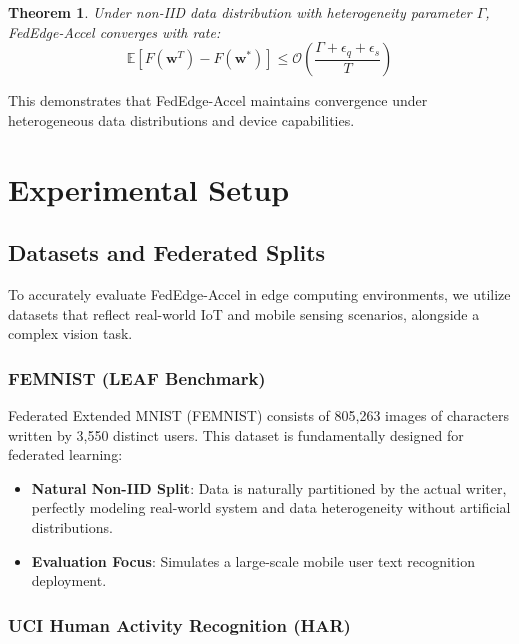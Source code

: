 \documentclass[journal]{IEEEtran}
\newtheorem{theorem}{Theorem}
\begin{document}
\begin{theorem}
Under non-IID data distribution with heterogeneity parameter $\Gamma$, FedEdge-Accel converges with rate:
\begin{equation}
\mathbb{E}[F(\mathbf{w}^T) - F(\mathbf{w}^*)] \leq \mathcal{O}\left(\frac{\Gamma + \epsilon_q + \epsilon_s}{T}\right)
\label{eq:heterogeneity_convergence}
\end{equation}
\end{theorem}

This demonstrates that FedEdge-Accel maintains convergence under heterogeneous data distributions and device capabilities.

\section{Experimental Setup}
\label{sec:experimental_setup}

\subsection{Datasets and Federated Splits}

To accurately evaluate FedEdge-Accel in edge computing environments, we utilize datasets that reflect real-world IoT and mobile sensing scenarios, alongside a complex vision task.

\subsubsection{FEMNIST (LEAF Benchmark)}

Federated Extended MNIST (FEMNIST) consists of 805,263 images of characters written by 3,550 distinct users. This dataset is fundamentally designed for federated learning:
\begin{itemize}
    \item \textbf{Natural Non-IID Split}: Data is naturally partitioned by the actual writer, perfectly modeling real-world system and data heterogeneity without artificial distributions.
    \item \textbf{Evaluation Focus}: Simulates a large-scale mobile user text recognition deployment.
\end{itemize}

\subsubsection{UCI Human Activity Recognition (HAR)}
\end{document}
